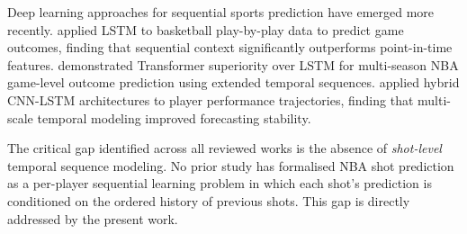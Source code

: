 \documentclass[conference]{IEEEtran}
\begin{document}
Deep learning approaches for sequential sports prediction have emerged
more recently.  \cite{b5} applied LSTM to basketball play-by-play data
to predict game outcomes, finding that sequential context significantly
outperforms point-in-time features.  \cite{b6} demonstrated Transformer
superiority over LSTM for multi-season NBA game-level outcome
prediction using extended temporal sequences.  \cite{b7} applied hybrid
CNN-LSTM architectures to player performance trajectories, finding that
multi-scale temporal modeling improved forecasting stability.

The critical gap identified across all reviewed works is the absence of
\textit{shot-level} temporal sequence modeling.  No prior study has
formalised NBA shot prediction as a per-player sequential learning
problem in which each shot's prediction is conditioned on the ordered
history of previous shots.  This gap is directly addressed by the
present work.
\end{document}
